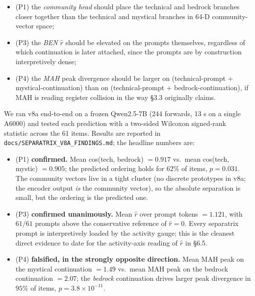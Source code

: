 \documentclass[
  11pt]{article}
\providecommand{\tightlist}{%
  \setlength{\itemsep}{0pt}\setlength{\parskip}{0pt}}
\begin{document}
\begin{itemize}
\tightlist
\item
  (P1) the \emph{community head} should place the technical and bedrock
  branches closer together than the technical and mystical branches in
  64-D community-vector space;
\item
  (P3) the \emph{BEN} \(\hat r\) should be elevated on the prompts
  themselves, regardless of which continuation is later attached, since
  the prompts are by construction interpretively dense;
\item
  (P4) the \emph{MAH} peak divergence should be larger on
  (technical-prompt + mystical-continuation) than on (technical-prompt +
  bedrock-continuation), if MAH is reading register collision in the way
  §3.3 originally claims.
\end{itemize}

We ran v8a end-to-end on a frozen Qwen2.5-7B (244 forwards, 13 s on a
single A6000) and tested each prediction with a two-sided Wilcoxon
signed-rank statistic across the 61 items. Results are reported in
\texttt{docs/SEPARATRIX\_V8A\_FINDINGS.md}; the headline numbers are:

\begin{itemize}
\tightlist
\item
  (P1) \textbf{confirmed.} Mean cos(tech, bedrock) \(= 0.917\) vs.~mean
  cos(tech, mystic) \(= 0.905\); the predicted ordering holds for
  \(62\%\) of items, \(p = 0.031\). The community vectors live in a
  tight cluster (no discrete prototypes in v8a; the encoder output
  \emph{is} the community vector), so the absolute separation is small,
  but the ordering is the predicted one.
\item
  (P3) \textbf{confirmed unanimously.} Mean \(\hat r\) over prompt
  tokens \(= 1.121\), with \(61/61\) prompts above the conservative
  reference of \(\hat r = 0\). Every separatrix prompt is interpretively
  loaded by the activity gauge; this is the cleanest direct evidence to
  date for the activity-axis reading of \(\hat r\) in §6.5.
\item
  (P4) \textbf{falsified, in the strongly opposite direction.} Mean MAH
  peak on the mystical continuation \(= 1.49\) vs.~mean MAH peak on the
  bedrock continuation \(= 2.07\); the \emph{bedrock} continuation
  drives larger peak divergence in \(95\%\) of items,
  \(p = 3.8 \times 10^{-11}\).
\end{itemize}
\end{document}
